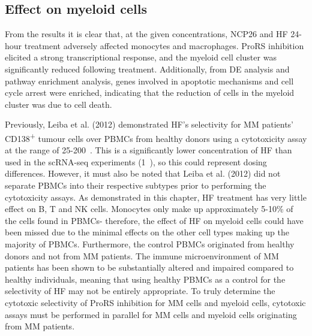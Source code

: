 \subsection{Effect on myeloid cells}
From the results it is clear that, at the given concentrations,  NCP26 and HF 24-hour treatment adversely affected monocytes and macrophages.
ProRS inhibition elicited a strong transcriptional response, and the myeloid cell cluster was significantly reduced following treatment.
Additionally, from DE analysis and pathway enrichment analysis, genes involved in apoptotic mechanisms and cell cycle arrest were enriched, indicating that the reduction of cells in the myeloid cluster was due to cell death.

Previously, Leiba et al. (2012) demonstrated HF's selectivity for MM patients' CD138\textsuperscript{+} tumour cells over PBMCs from healthy donors\cite{leiba2012halofuginone} using a cytotoxicity assay at the range of 25-200\si{\nano\Molar}.
This is a significantly lower concentration of HF than used in the scRNA-seq experiments (1\si{\micro\Molar}), so this could represent dosing differences.
However, it must also be noted that Leiba et al. (2012) did not separate PBMCs into their respective subtypes prior to performing the cytotoxicity assays.
As demonstrated in this chapter, HF treatment has very little effect on B, T and NK cells.
Monocytes only make up approximately 5-10\% of the cells found in PBMCs- therefore, the effect of HF on myeloid cells could have been missed due to the minimal effects on the other cell types making up the majority of PBMCs.
Furthermore, the control PBMCs originated from healthy donors and not from MM patients.
The immune microenvironment of MM patients has been shown to be substantially altered and impaired compared to healthy individuals\cite{de2013analysis}, meaning that using healthy PBMCs as a control for the selectivity of HF may not be entirely appropriate.
To truly determine the cytotoxic selectivity of ProRS inhibition for MM cells and myeloid cells, cytotoxic assays must be performed in parallel for MM cells and myeloid cells originating from MM patients.

